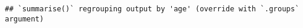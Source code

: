 \documentclass[
]{article}
\newenvironment{Shaded}{\begin{snugshade}}{\end{snugshade}}
\newcommand{\CommentTok}[1]{\textcolor[rgb]{0.56,0.35,0.01}{\textit{#1}}}
\newcommand{\DecValTok}[1]{\textcolor[rgb]{0.00,0.00,0.81}{#1}}
\newcommand{\KeywordTok}[1]{\textcolor[rgb]{0.13,0.29,0.53}{\textbf{#1}}}
\newcommand{\NormalTok}[1]{#1}
\newcommand{\OperatorTok}[1]{\textcolor[rgb]{0.81,0.36,0.00}{\textbf{#1}}}
\newcommand{\StringTok}[1]{\textcolor[rgb]{0.31,0.60,0.02}{#1}}
\begin{document}
\begin{Shaded}
\end{Shaded}

\begin{verbatim}
## `summarise()` regrouping output by 'age' (override with `.groups` argument)
\end{verbatim}
\end{document}
